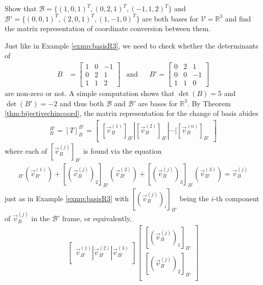 \begin{exmp}
\label{exmp:changecoord}
Show that $\mathcal{B} = \{(1,0,1)^T, (0,2,1)^T, (-1,1,2)^T\}$ and $\mathcal{B}' = \{(0,0,1)^T, (2,0,1)^T, (1,-1,0)^T\}$ are both bases for $\mathcal{V} = \mathbb{R}^3$ and find the matrix representation of coordinate conversion between them.
\end{exmp}
\begin{solution}
Just like in Example \ref{exmp:basisR3}, we need to check whether the determinants of
\begin{align*}
B &= 
\begin{bmatrix}
1 & 0 & -1\\
0 & 2 & 1 \\
1 & 1 & 2
\end{bmatrix}
& \text{and} &
& B' = 
\begin{bmatrix}
0 & 2 & 1 \\
0 & 0 & -1 \\
1 & 1 & 0
\end{bmatrix}
\end{align*}
are non-zero or not. A simple computation shows that $\det(B) = 5$ and $\det(B') = -2$ and thus both $\mathcal{B}$ and $\mathcal{B}'$ are bases for $\mathbb{R}^3$. By Theorem \ref{thm:bijectivechincoord}, the matrix representation for the change of basis abides
\begin{align*}
[\text{id}]_B^{B'} = [T]_B^{B'} = \begin{bmatrix}
[\vec{v}_{B}^{(1)}]_{B'} | [\vec{v}_{B}^{(2)}]_{B'} | \cdots | [\vec{v}_{B}^{(n)}]_{B'}
\end{bmatrix}
\end{align*}
where each of $[\vec{v}_{B}^{(j)}]_{B'} $ is found via the equation
\begin{align*}
[(\vec{v}_{B}^{(j)})_1]_{B'} (\vec{v}_{B'}^{(1)}) + [(\vec{v}_{B}^{(j)})_2]_{B'} (\vec{v}_{B'}^{(2)}) + [(\vec{v}_{B}^{(j)})_3]_{B'} (\vec{v}_{B'}^{(3)}) = \vec{v}_{B}^{(j)}
\end{align*}
just as in Example \ref{exmp:basisR3} with $[(\vec{v}_{B}^{(j)})_i]_{B'}$ being the $i$-th component of $\vec{v}_{B}^{(j)}$ in the $\mathcal{B}'$ frame, or equivalently,
\begin{align*}
\begin{bmatrix}
\vec{v}_{B'}^{(1)} | \vec{v}_{B'}^{(2)} | \vec{v}_{B'}^{(3)}
\end{bmatrix}
\begin{bmatrix}
[(\vec{v}_{B}^{(j)})_1]_{B'} \\
[(\vec{v}_{B}^{(j)})_2]_{B'} \\

\end{bmatrix}
\end{align*}
\end{solution}
